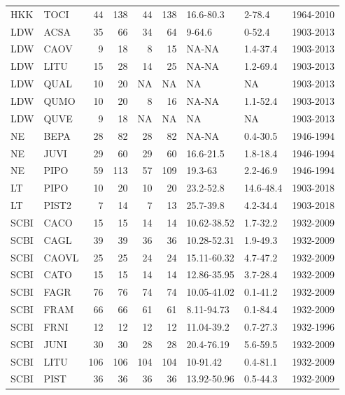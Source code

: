 \documentclass[
]{article}
\begin{document}
\begin{table}[!h]
{\begin{tabular}{llrrrrlll}
\addlinespace
HKK & TOCI & 44 & 138 & 44 & 138 & 16.6-80.3 & 2-78.4 & 1964-2010\\
\addlinespace
LDW & ACSA & 35 & 66 & 34 & 64 & 9-64.6 & 0-52.4 & 1903-2013\\
\addlinespace
LDW & CAOV & 9 & 18 & 8 & 15 & NA-NA & 1.4-37.4 & 1903-2013\\
\addlinespace
LDW & LITU & 15 & 28 & 14 & 25 & NA-NA & 1.2-69.4 & 1903-2013\\
\addlinespace
LDW & QUAL & 10 & 20 & NA & NA & NA & NA & 1903-2013\\
\addlinespace
LDW & QUMO & 10 & 20 & 8 & 16 & NA-NA & 1.1-52.4 & 1903-2013\\
\addlinespace
LDW & QUVE & 9 & 18 & NA & NA & NA & NA & 1903-2013\\
\addlinespace
NE & BEPA & 28 & 82 & 28 & 82 & NA-NA & 0.4-30.5 & 1946-1994\\
\addlinespace
NE & JUVI & 29 & 60 & 29 & 60 & 16.6-21.5 & 1.8-18.4 & 1946-1994\\
\addlinespace
NE & PIPO & 59 & 113 & 57 & 109 & 19.3-63 & 2.2-46.9 & 1946-1994\\
\addlinespace
LT & PIPO & 10 & 20 & 10 & 20 & 23.2-52.8 & 14.6-48.4 & 1903-2018\\
\addlinespace
LT & PIST2 & 7 & 14 & 7 & 13 & 25.7-39.8 & 4.2-34.4 & 1903-2018\\
\addlinespace
SCBI & CACO & 15 & 15 & 14 & 14 & 10.62-38.52 & 1.7-32.2 & 1932-2009\\
\addlinespace
SCBI & CAGL & 39 & 39 & 36 & 36 & 10.28-52.31 & 1.9-49.3 & 1932-2009\\
\addlinespace
SCBI & CAOVL & 25 & 25 & 24 & 24 & 15.11-60.32 & 4.7-47.2 & 1932-2009\\
\addlinespace
SCBI & CATO & 15 & 15 & 14 & 14 & 12.86-35.95 & 3.7-28.4 & 1932-2009\\
\addlinespace
SCBI & FAGR & 76 & 76 & 74 & 74 & 10.05-41.02 & 0.1-41.2 & 1932-2009\\
\addlinespace
SCBI & FRAM & 66 & 66 & 61 & 61 & 8.11-94.73 & 0.1-84.4 & 1932-2009\\
\addlinespace
SCBI & FRNI & 12 & 12 & 12 & 12 & 11.04-39.2 & 0.7-27.3 & 1932-1996\\
\addlinespace
SCBI & JUNI & 30 & 30 & 28 & 28 & 20.4-76.19 & 5.6-59.5 & 1932-2009\\
\addlinespace
SCBI & LITU & 106 & 106 & 104 & 104 & 10-91.42 & 0.4-81.1 & 1932-2009\\
\addlinespace
SCBI & PIST & 36 & 36 & 36 & 36 & 13.92-50.96 & 0.5-44.3 & 1932-2009\\

\end{tabular}}
\end{table}
\end{document}
